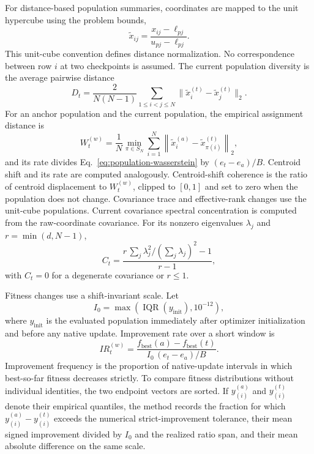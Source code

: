 For distance-based population summaries, coordinates are mapped to the unit hypercube using the problem bounds,
\begin{equation}
  \widetilde x_{ij}
  =\frac{x_{ij}-\ell_{pj}}{u_{pj}-\ell_{pj}}.
  \label{eq:unit-cube-scaling}
\end{equation}
This unit-cube convention defines distance normalization.  No correspondence between row $i$ at two checkpoints is assumed.  The current population diversity is the average pairwise distance
\begin{equation}
  D_t=\frac{2}{N(N-1)}
  \sum_{1\le i<j\le N}
  \lVert\widetilde x_i^{(t)}-\widetilde x_j^{(t)}\rVert_2.
  \label{eq:population-diversity}
\end{equation}
For an anchor population and the current population, the empirical assignment distance is
\begin{equation}
  W_t^{(w)}=
  \frac{1}{N}
  \min_{\pi\in S_N}
  \sum_{i=1}^{N}
  \left\lVert
  \widetilde x_i^{(a)}-
  \widetilde x_{\pi(i)}^{(t)}
  \right\rVert_2,
  \label{eq:population-wasserstein}
\end{equation}
and its rate divides Eq.~\eqref{eq:population-wasserstein} by $(e_t-e_a)/B$.  Centroid shift and its rate are computed analogously.  Centroid-shift coherence is the ratio of centroid displacement to $W_t^{(w)}$, clipped to $[0,1]$ and set to zero when the population does not change.  Covariance trace and effective-rank changes use the unit-cube populations.  Current covariance spectral concentration is computed from the raw-coordinate covariance.  For its nonzero eigenvalues $\lambda_j$ and $r=\min(d,N-1)$,
\begin{equation}
  C_t=
  \frac{r\,\sum_j\lambda_j^2/(\sum_j\lambda_j)^2-1}{r-1},
  \label{eq:covariance-concentration}
\end{equation}
with $C_t=0$ for a degenerate covariance or $r\le1$.

Fitness changes use a shift-invariant scale.  Let
\begin{equation}
  I_0=\max\!\left(\operatorname{IQR}(y_{\mathrm{init}}),10^{-12}\right),
  \label{eq:initial-fitness-scale}
\end{equation}
where $y_{\mathrm{init}}$ is the evaluated population immediately after optimizer initialization and before any native update.  Improvement rate over a short window is
\begin{equation}
  IR_t^{(w)}=
  \frac{f_{\mathrm{best}}(a)-f_{\mathrm{best}}(t)}
       {I_0\,(e_t-e_a)/B}.
  \label{eq:improvement-rate}
\end{equation}
Improvement frequency is the proportion of native-update intervals in which best-so-far fitness decreases strictly.  To compare fitness distributions without individual identities, the two endpoint vectors are sorted.  If $y_{(i)}^{(a)}$ and $y_{(i)}^{(t)}$ denote their empirical quantiles, the method records the fraction for which $y_{(i)}^{(a)}-y_{(i)}^{(t)}$ exceeds the numerical strict-improvement tolerance, their mean signed improvement divided by $I_0$ and the realized ratio span, and their mean absolute difference on the same scale.

